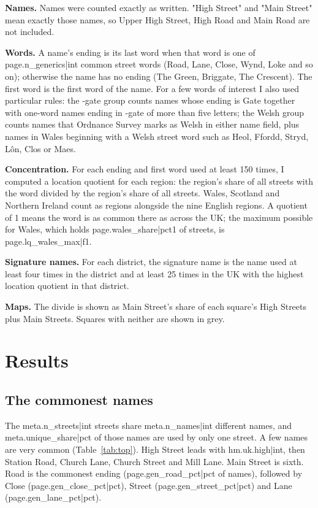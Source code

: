 \documentclass[11pt,a4paper]{article}
\begin{document}
\textbf{Names.} Names were counted exactly as written. "High Street" and "Main Street" mean exactly those names, so Upper High Street, High Road and Main Road are not included.

\textbf{Words.} A name's ending is its last word when that word is one of {{page.n_generics|int}} common street words (Road, Lane, Close, Wynd, Loke and so on); otherwise the name has no ending (The Green, Briggate, The Crescent). The first word is the first word of the name. For a few words of interest I also used particular rules: the -gate group counts names whose ending is Gate together with one-word names ending in -gate of more than five letters; the Welsh group counts names that Ordnance Survey marks as Welsh in either name field, plus names in Wales beginning with a Welsh street word such as Heol, Ffordd, Stryd, Lôn, Clos or Maes.

\textbf{Concentration.} For each ending and first word used at least 150 times, I computed a location quotient for each region: the region's share of all streets with the word divided by the region's share of all streets. Wales, Scotland and Northern Ireland count as regions alongside the nine English regions. A quotient of 1 means the word is as common there as across the UK; the maximum possible for Wales, which holds {{page.wales_share|pct1}} of streets, is {{page.lq_wales_max|f1}}.

\textbf{Signature names.} For each district, the signature name is the name used at least four times in the district and at least 25 times in the UK with the highest location quotient in that district.

\textbf{Maps.} The divide is shown as Main Street's share of each square's High Streets plus Main Streets. Squares with neither are shown in grey.

\section{Results}

\subsection{The commonest names}

The {{meta.n_streets|int}} streets share {{meta.n_names|int}} different names, and {{meta.unique_share|pct}} of those names are used by only one street. A few names are very common (Table~\ref{tab:top}). High Street leads with {{hm.uk.high|int}}, then Station Road, Church Lane, Church Street and Mill Lane. Main Street is sixth. Road is the commonest ending ({{page.gen_road_pct|pct}} of names), followed by Close ({{page.gen_close_pct|pct}}), Street ({{page.gen_street_pct|pct}}) and Lane ({{page.gen_lane_pct|pct}}).
\end{document}
